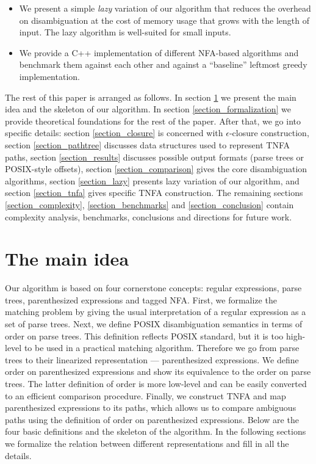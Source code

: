 \documentclass[AMA,STIX1COL]{WileyNJD-v2}
\begin{document}
\begin{itemize}[itemsep=0.5em]
    \item We present a simple \emph{lazy} variation of our algorithm
        that reduces the overhead on disambiguation
        at the cost of memory usage that grows with the length of input.
        The lazy algorithm is well-suited for small inputs.

    \item We provide a C++ implementation of different NFA-based algorithms
        and benchmark them against each other and against a ``baseline'' leftmost greedy implementation.
    \\[-0.5em]
\end{itemize}

The rest of this paper is arranged as follows.
In section \ref{section_main} we present the main idea and the skeleton of our algorithm.
In section \ref{section_formalization} we provide theoretical foundations for the rest of the paper.
After that, we go into specific details:
section \ref{section_closure} is concerned with $\epsilon$-closure construction,
section \ref{section_pathtree} discusses data structures used to represent TNFA paths,
section \ref{section_results} discusses possible output formats (parse trees or POSIX-style offsets),
section \ref{section_comparison} gives the core disambiguation algorithms,
section \ref{section_lazy} presents lazy variation of our algorithm,
and section \ref{section_tnfa} gives specific TNFA construction.
The remaining sections \ref{section_complexity}, \ref{section_benchmarks} and \ref{section_conclusion}
contain complexity analysis, benchmarks, conclusions and directions for future work.

\section{The main idea}\label{section_main}

Our algorithm is based on four cornerstone concepts:
regular expressions, parse trees, parenthesized expressions and tagged NFA.
%
First, we formalize the matching problem
by giving the usual interpretation of a regular expression as a set of parse trees.
%
Next, we define POSIX disambiguation semantics in terms of order on parse trees.
This definition reflects POSIX standard,
but it is too high-level to be used in a practical matching algorithm.
%
Therefore we go from parse trees to their linearized representation --- parenthesized expressions.
We define order on parenthesized expressions and show its equivalence to the order on parse trees.
The latter definition of order is more low-level and can be easily converted to an efficient comparison procedure.
%
Finally, we construct TNFA and map parenthesized expressions to its paths,
which allows us to compare ambiguous paths using the definition of order on parenthesized expressions.
%
Below are the four basic definitions and the skeleton of the algorithm.
In the following sections we formalize the relation between different representations and fill in all the details.
\end{document}
